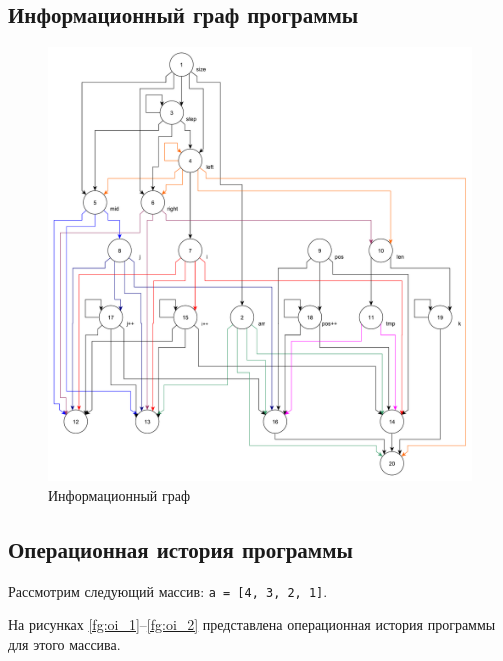 \clearpage

\subsection{Информационный граф программы}

\begin{figure}[h]
	\centering
	\includegraphics[height=0.6\textheight]{img/информационный_граф.pdf}
	\caption{Информационный граф}
	\label{fg:ig}
\end{figure}

\clearpage

\subsection{Операционная история программы}

Рассмотрим следующий массив: \texttt{a = [4, 3, 2, 1]}.

На рисунках \ref{fg:oi_1}--\ref{fg:oi_2} представлена операционная история программы для этого массива.

